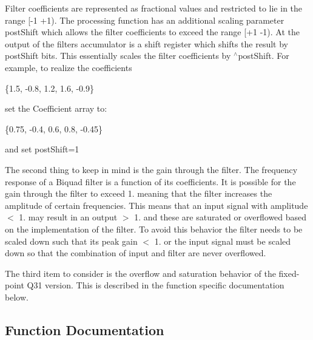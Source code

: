 \begin{DoxyParagraph}{}
Filter coefficients are represented as fractional values and restricted to lie in the range {\ttfamily \mbox{[}-\/1 +1)}. The processing function has an additional scaling parameter {\ttfamily post\+Shift} which allows the filter coefficients to exceed the range {\ttfamily \mbox{[}+1 -\/1)}. At the output of the filter\textquotesingle{}s accumulator is a shift register which shifts the result by {\ttfamily post\+Shift} bits. This essentially scales the filter coefficients by {$^\wedge$post\+Shift}. For example, to realize the coefficients 
\begin{DoxyPre}
   \{1.5, -0.8, 1.2, 1.6, -0.9\}
\end{DoxyPre}
 set the Coefficient array to\+: 
\begin{DoxyPre}
   \{0.75, -0.4, 0.6, 0.8, -0.45\}
\end{DoxyPre}
 and set {\ttfamily post\+Shift=1}
\end{DoxyParagraph}
\begin{DoxyParagraph}{}
The second thing to keep in mind is the gain through the filter. The frequency response of a Biquad filter is a function of its coefficients. It is possible for the gain through the filter to exceed 1. meaning that the filter increases the amplitude of certain frequencies. This means that an input signal with amplitude $<$ 1. may result in an output $>$ 1. and these are saturated or overflowed based on the implementation of the filter. To avoid this behavior the filter needs to be scaled down such that its peak gain $<$ 1. or the input signal must be scaled down so that the combination of input and filter are never overflowed.
\end{DoxyParagraph}
\begin{DoxyParagraph}{}
The third item to consider is the overflow and saturation behavior of the fixed-\/point Q31 version. This is described in the function specific documentation below. 
\end{DoxyParagraph}


\subsection{Function Documentation}
